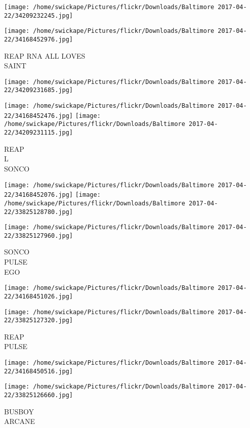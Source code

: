 \documentclass[10pt,letterpaper]{article}
\begin{document}
\texttt{[image: /home/swickape/Pictures/flickr/Downloads/Baltimore 2017-04-22/34209232245.jpg]}

\vspace{0.25in}
\texttt{[image: /home/swickape/Pictures/flickr/Downloads/Baltimore 2017-04-22/34168452976.jpg]}

REAP RNA ALL LOVES\\
SAINT
\pagebreak

\texttt{[image: /home/swickape/Pictures/flickr/Downloads/Baltimore 2017-04-22/34209231685.jpg]}

\vspace{0.25in}
\texttt{[image: /home/swickape/Pictures/flickr/Downloads/Baltimore 2017-04-22/34168452476.jpg]}
\texttt{[image: /home/swickape/Pictures/flickr/Downloads/Baltimore 2017-04-22/34209231115.jpg]}

REAP\\
L\\
SONCO
\pagebreak

\texttt{[image: /home/swickape/Pictures/flickr/Downloads/Baltimore 2017-04-22/34168452076.jpg]}
\texttt{[image: /home/swickape/Pictures/flickr/Downloads/Baltimore 2017-04-22/33825128780.jpg]}

\vspace{0.25in}
\texttt{[image: /home/swickape/Pictures/flickr/Downloads/Baltimore 2017-04-22/33825127960.jpg]}

SONCO\\
PULSE\\
EGO
\pagebreak

\texttt{[image: /home/swickape/Pictures/flickr/Downloads/Baltimore 2017-04-22/34168451026.jpg]}

\vspace{0.25in}
\texttt{[image: /home/swickape/Pictures/flickr/Downloads/Baltimore 2017-04-22/33825127320.jpg]}

REAP\\
PULSE
\pagebreak

\texttt{[image: /home/swickape/Pictures/flickr/Downloads/Baltimore 2017-04-22/34168450516.jpg]}

\vspace{0.25in}
\texttt{[image: /home/swickape/Pictures/flickr/Downloads/Baltimore 2017-04-22/33825126660.jpg]}

BUSBOY\\
ARCANE
\pagebreak
\end{document}
